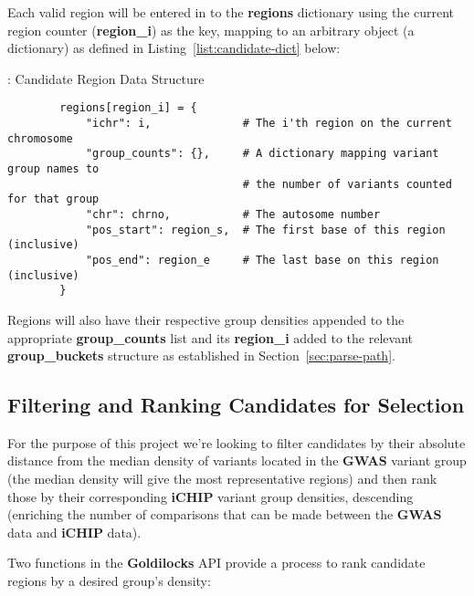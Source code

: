 Each valid region will be entered in to the \textbf{regions} dictionary using
the current region counter (\textbf{region\_i}) as the key, mapping to an
arbitrary object (a dictionary) as defined in Listing~\ref{list:candidate-dict}
below:

\begin{listing}[H]
    \caption[candidate-dict]{: Candidate Region Data Structure}
    \label{list:candidate-dict}
    \begin{verbatim}
        regions[region_i] = {
            "ichr": i,              # The i'th region on the current chromosome
            "group_counts": {},     # A dictionary mapping variant group names to
                                    # the number of variants counted for that group
            "chr": chrno,           # The autosome number
            "pos_start": region_s,  # The first base of this region (inclusive)
            "pos_end": region_e     # The last base on this region (inclusive)
        }
    \end{verbatim}
\end{listing}

Regions will also have their respective group densities appended to the
appropriate \textbf{group\_counts} list and its \textbf{region\_i} added to the
relevant \textbf{group\_buckets} structure as established in
Section~\ref{sec:parse-path}.


\subsection{Filtering and Ranking Candidates for Selection}
\label{sec:filter-rank}

For the purpose of this project we're looking to filter candidates by their
absolute distance from the median density of variants located in the
\textbf{GWAS} variant group (the median density will give the most representative
regions) and then rank those by their corresponding \textbf{iCHIP} variant group
densities, descending (enriching the number of comparisons that can be made
between the \textbf{GWAS} data and \textbf{iCHIP} data).

Two functions in the \textbf{Goldilocks} API provide a process to rank candidate
regions by a desired group's density:

